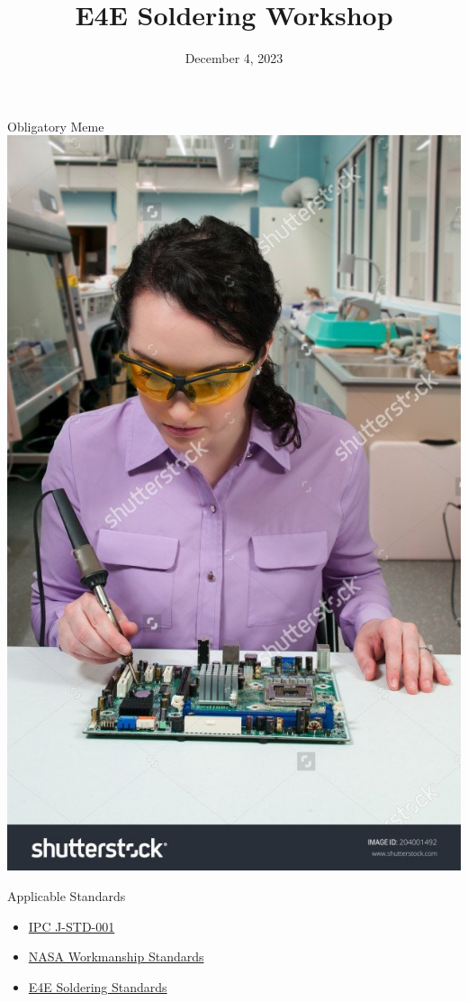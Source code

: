 \documentclass[aspectratio=169]{beamer}
\title{E4E Soldering Workshop}
\institute{Engineers for Exploration, UC San Diego}
\date{December 4, 2023}
\begin{document}
\maketitle
\begin{frame}{Obligatory Meme}
    \centering
    \includegraphics[height=0.8\textheight]{soldering_meme.jpg}
\end{frame}
\begin{frame}{Applicable Standards}
    \begin{itemize}
        \item \href{https://shop.ipc.org/ipc-j-std-001/ipc-j-std-001-standard-amendments/Revision-f/english}{IPC J-STD-001}
        \item \href{https://workmanship.nasa.gov/lib/insp/2\%20books/frameset.html}{NASA Workmanship Standards}
        \item \href{https://github.com/UCSD-E4E/e4e-hw/blob/main/workshops/soldering/standards.md}{E4E Soldering Standards}
    \end{itemize}
\end{frame}
\end{document}
